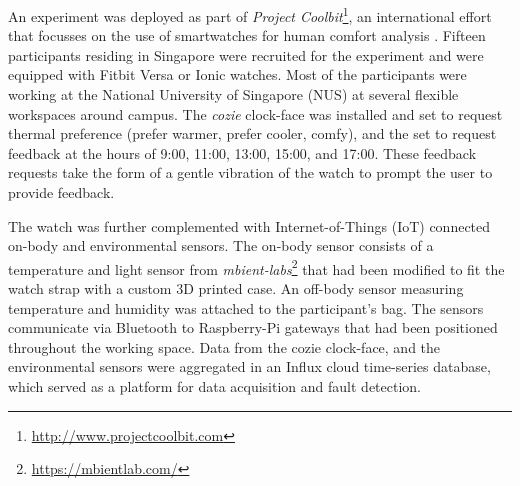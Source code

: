 
An experiment was deployed as part of \emph{Project Coolbit}\footnote{\url{http://www.projectcoolbit.com}}, an international effort that focusses on the use of smartwatches for human comfort analysis \cite{nazarian2019geophysics}. Fifteen participants residing in Singapore were recruited for the experiment and were equipped with Fitbit Versa or Ionic watches. Most of the participants were working at the National University of Singapore (NUS) at several flexible workspaces around campus.  The \emph{cozie} clock-face was installed and set to request thermal preference (prefer warmer, prefer cooler, comfy), and the set to request feedback at the hours of 9:00, 11:00, 13:00, 15:00, and 17:00. These feedback requests take the form of a gentle vibration of the watch to prompt the user to provide feedback.

The watch was further complemented with Internet-of-Things (IoT) connected on-body and environmental sensors. The on-body sensor consists of a temperature and light sensor from \emph{mbient-labs}\footnote{\url{https://mbientlab.com/}} that had been modified to fit the watch strap with a custom 3D printed case. An off-body sensor measuring temperature and humidity was attached to the participant's bag. The sensors communicate via Bluetooth to Raspberry-Pi gateways that had been positioned throughout the working space. Data from the cozie clock-face, and the environmental sensors were aggregated in an Influx cloud time-series database, which served as a platform for data acquisition and fault detection. 



